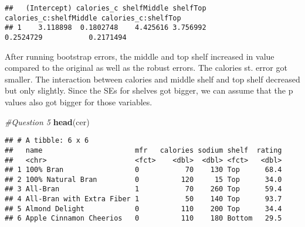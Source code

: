 \documentclass[]{article}
\newenvironment{Shaded}{\begin{snugshade}}{\end{snugshade}}
\newcommand{\CommentTok}[1]{\textcolor[rgb]{0.56,0.35,0.01}{\textit{#1}}}
\newcommand{\DataTypeTok}[1]{\textcolor[rgb]{0.13,0.29,0.53}{#1}}
\newcommand{\DecValTok}[1]{\textcolor[rgb]{0.00,0.00,0.81}{#1}}
\newcommand{\KeywordTok}[1]{\textcolor[rgb]{0.13,0.29,0.53}{\textbf{#1}}}
\newcommand{\NormalTok}[1]{#1}
\newcommand{\OperatorTok}[1]{\textcolor[rgb]{0.81,0.36,0.00}{\textbf{#1}}}
\newcommand{\StringTok}[1]{\textcolor[rgb]{0.31,0.60,0.02}{#1}}
\begin{document}
\begin{Shaded}
\end{Shaded}

\begin{verbatim}
##   (Intercept) calories_c shelfMiddle shelfTop calories_c:shelfMiddle calories_c:shelfTop
## 1    3.118898  0.1802748    4.425616 3.756992              0.2524729           0.2171494
\end{verbatim}

After running bootstrap errors, the middle and top shelf increased in
value compared to the original as well as the robust errors. The
calories st. error got smaller. The interaction between calories and
middle shelf and top shelf decreased but only slightly. Since the SEs
for shelves got bigger, we can assume that the p values also got bigger
for those variables.

\begin{Shaded}
\begin{Highlighting}[]
\CommentTok{#Question 5}
\KeywordTok{head}\NormalTok{(cer)}
\end{Highlighting}
\end{Shaded}

\begin{verbatim}
## # A tibble: 6 x 6
##   name                      mfr   calories sodium shelf  rating
##   <chr>                     <fct>    <dbl>  <dbl> <fct>   <dbl>
## 1 100% Bran                 0           70    130 Top      68.4
## 2 100% Natural Bran         0          120     15 Top      34.0
## 3 All-Bran                  1           70    260 Top      59.4
## 4 All-Bran with Extra Fiber 1           50    140 Top      93.7
## 5 Almond Delight            0          110    200 Top      34.4
## 6 Apple Cinnamon Cheerios   0          110    180 Bottom   29.5
\end{verbatim}
\end{document}

